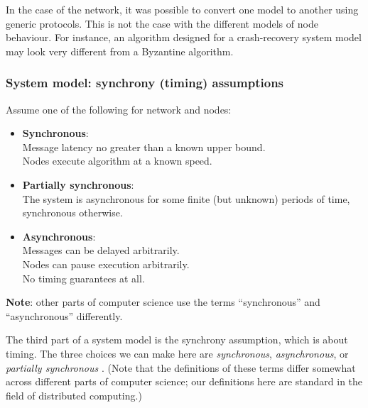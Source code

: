In the case of the network, it was possible to convert one model to another using generic protocols.
This is not the case with the different models of node behaviour.
For instance, an algorithm designed for a crash-recovery system model may look very different from a Byzantine algorithm.

\begin{frame}
    \label{s:model-synchrony}
    \frametitle{System model: synchrony (timing) assumptions}
    Assume one of the following for network and nodes:
    \begin{itemize}
        \item \textbf{Synchronous}:\\
            Message latency no greater than a known upper bound.\\
            Nodes execute algorithm at a known speed.\pause
        \item \textbf{Partially synchronous}:\\
            The system is asynchronous for some finite (but unknown) periods of time, synchronous otherwise.\pause
        \item \textbf{Asynchronous}:\\
            Messages can be delayed arbitrarily.\\
            Nodes can pause execution arbitrarily.\\
            No timing guarantees at all.\\[1em]
    \end{itemize}
    \textbf{Note}: other parts of computer science use the terms ``synchronous'' and ``asynchronous'' differently.
\end{frame}
\label{l:model-synchrony}

The third part of a system model is the synchrony assumption, which is about timing.
The three choices we can make here are \emph{synchronous}, \emph{asynchronous}, or \emph{partially synchronous} \citep{Dwork:1988dr}.
(Note that the definitions of these terms differ somewhat across different parts of computer science; our definitions here are standard in the field of distributed computing.)


